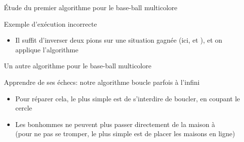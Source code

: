 \documentclass[final,hyperref={pdfpagelabels=false}]{beamer}
\renewenvironment{Coupe}{   }{   }
\begin{document}
\begin{Coupe}
\begin{frame}{Étude du premier algorithme pour le base-ball multicolore}
  \begin{block}{Exemple d'exécution incorrecte}
    \begin{itemize}
    \item Il suffit d'inverser deux pions sur une situation gagnée (ici,
       et ), et on applique l'algorithme 
    \end{itemize}\vspace{-\baselineskip}
    
  \end{block}
\end{frame}
\newcommand{\ligneMaison}[2]{
  \begin{tikzpicture}
    \foreach \x/\col in {#1} {
      \draw (.55*\x,.65) node[shape=circle,fill=\col,draw=black,inner sep=.1] {~~~};
    }
    \foreach \x/\col in {#2} {
      \draw (.55*\x,.3) node[shape=circle,fill=\col,draw=black,inner sep=.1] {~~~};
    }
    \foreach \x/\col in {1/A, 2/B, 3/C, 4/D, 5/E} {
      \draw (.55*\x,-.25) node[shape=ellipse,fill=\col,draw=black,rotate=90] {~~};
    }
  \end{tikzpicture}
}
\begin{frame}{Un autre algorithme pour le base-ball multicolore}
  \begin{block}{Apprendre de ses échecs: {\color{black}notre algorithme boucle parfois à l'infini}}
    \begin{itemize}\vspace{-.2\baselineskip}
    \item Pour réparer cela, le plus simple est de s'interdire de boucler, en
      coupant le cercle
    \item Les bonhommes ne peuvent plus passer directement de la maison
       à \\
      (pour ne pas se tromper, le plus simple est de placer les maisons en ligne)
    \end{itemize}

    \begin{columns}
      \begin{column}{.2\linewidth}
        ~
      \end{column}
      \begin{column}{.2\linewidth}\center
      \end{column}


\end{columns}
\end{block}
\end{frame}
\end{Coupe}
\end{document}
